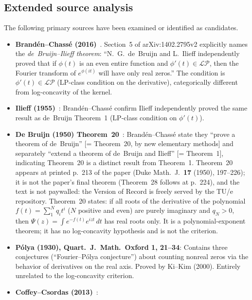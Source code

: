 \documentclass[11pt]{article}
\theoremstyle{definition}
\theoremstyle{remark}
\begin{document}
\subsection{Extended source analysis}\label{sec:extended_source}

The following primary sources have been examined or identified as candidates.

\begin{itemize}
\item \textbf{Brand\'{e}n--Chass\'{e} (2016)}~\cite{brandenchasse2016}.
  Section~5 of arXiv:1402.2795v2 explicitly names the \emph{de~Bruijn--Ilieff theorem}:
  ``N.~G.\ de~Bruijn and L.~Ilieff independently proved that if $\phi(t)$ is
  an even entire function and $\phi'(t)\in\mathcal{LP}$, then the Fourier transform of
  $e^{\phi(it)}$ will have only real zeros.''
  The condition is $\phi'(t)\in\mathcal{LP}$ (LP-class condition on the derivative),
  categorically different from log-concavity of the kernel.
\item \textbf{Ilieff (1955)}~\cite{ilieff1955}:
  Brand\'{e}n--Chass\'{e} confirm Ilieff independently proved the same result as
  de~Bruijn Theorem~1 (LP-class condition on $\phi'(t)$).
\item \textbf{De Bruijn (1950) Theorem~20}~\cite{debruijn1950}:
  Brand\'{e}n--Chass\'{e} state they ``prove a
  theorem of de~Bruijn'' [= Theorem~20, by new elementary methods] and separately
  ``extend a theorem of de~Bruijn and Ilieff'' [= Theorem~1], indicating Theorem~20
  is a distinct result from Theorem~1.
  Theorem~20 appears at printed p.~213 of the paper (Duke Math.\ J.\ \textbf{17}
  (1950), 197--226); it is not the paper's final theorem (Theorem~28 follows
  at p.~224), and the text is not paywalled: the Version of Record is freely
  served by the TU/e repository.
  Theorem~20 states: if all roots of the derivative of the polynomial
  $f(t) = \sum_1^N q_i t^i$ ($N$ positive and even) are purely imaginary and
  $q_N > 0$, then $\Psi(z) = \int e^{-f(t)} e^{izt}\,dt$ has real roots only.
  It is a polynomial-exponent theorem; it has no log-concavity hypothesis
  and is not the criterion.
\item \textbf{P\'{o}lya (1930), Quart.\ J.\  Math.\ Oxford 1, 21--34}:
  Contains three conjectures (``Fourier--P\'{o}lya conjecture'') about counting
  nonreal zeros via the behavior of derivatives on the real axis.
  Proved by Ki--Kim (2000).  Entirely unrelated to the log-concavity criterion.
\item \textbf{Coffey--Csordas (2013)}~\cite{csordas2013}:

\end{itemize}
\end{document}
